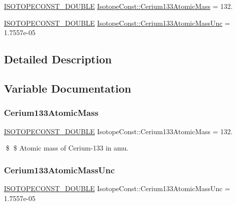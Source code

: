 \begin{DoxyCompactItemize}
\item 
\mbox{\hyperlink{group___isotope_const-_macros_ga8f45a7272ce02c0b4c65c44636ed719a}{I\+S\+O\+T\+O\+P\+E\+C\+O\+N\+S\+T\+\_\+\+D\+O\+U\+B\+LE}} \mbox{\hyperlink{group___isotope_const-_cerium-_ce133_ga67b69e401898219bad4bed619df845c7}{Isotope\+Const\+::\+Cerium133\+Atomic\+Mass}} = 132.
\item 
\mbox{\hyperlink{group___isotope_const-_macros_ga8f45a7272ce02c0b4c65c44636ed719a}{I\+S\+O\+T\+O\+P\+E\+C\+O\+N\+S\+T\+\_\+\+D\+O\+U\+B\+LE}} \mbox{\hyperlink{group___isotope_const-_cerium-_ce133_ga93e71199f7da937e25eadc2ca455480f}{Isotope\+Const\+::\+Cerium133\+Atomic\+Mass\+Unc}} = 1.\+7557e-\/05
\end{DoxyCompactItemize}


\subsection{Detailed Description}


\subsection{Variable Documentation}
\mbox{\label{group___isotope_const-_cerium-_ce133_ga67b69e401898219bad4bed619df845c7}} 
\subsubsection{\texorpdfstring{Cerium133\+Atomic\+Mass}{Cerium133AtomicMass}}
{\footnotesize\ttfamily \mbox{\hyperlink{group___isotope_const-_macros_ga8f45a7272ce02c0b4c65c44636ed719a}{I\+S\+O\+T\+O\+P\+E\+C\+O\+N\+S\+T\+\_\+\+D\+O\+U\+B\+LE}} Isotope\+Const\+::\+Cerium133\+Atomic\+Mass = 132.}

\$ \$ Atomic mass of Cerium-\/133 in amu. \mbox{\label{group___isotope_const-_cerium-_ce133_ga93e71199f7da937e25eadc2ca455480f}} 
\subsubsection{\texorpdfstring{Cerium133\+Atomic\+Mass\+Unc}{Cerium133AtomicMassUnc}}
{\footnotesize\ttfamily \mbox{\hyperlink{group___isotope_const-_macros_ga8f45a7272ce02c0b4c65c44636ed719a}{I\+S\+O\+T\+O\+P\+E\+C\+O\+N\+S\+T\+\_\+\+D\+O\+U\+B\+LE}} Isotope\+Const\+::\+Cerium133\+Atomic\+Mass\+Unc = 1.\+7557e-\/05}


